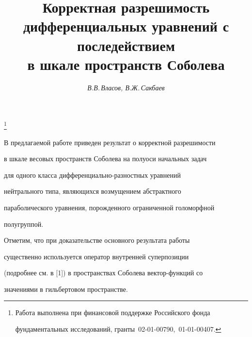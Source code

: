 \author{\it В.В.\,Власов, В.Ж.\,Сакбаев}




\title{Корректная разрешимость дифференциальных уравнений с последействием\\


в шкале пространств Соболева}


\thanks{Работа выполнена при финансовой поддержке Российского фонда


фундаментальных исследований, гранты \No\,02-01-00790, \No\,01-01-00407.}





\date{}




\pagestyle{plain} %







\maketitle


\label{begin}














В предлагаемой работе приведен результат о корректной разрешимости


в шкале весовых пространств Соболева на полуоси начальных задач


для одного класса дифференциально-разностных уравнений


нейтрального типа, являющихся возмущением абстрактного


параболического уравнения, порожденного ограниченной голоморфной


полугруппой.





Отметим, что при доказательстве основного результата работы


существенно используется оператор внутренней суперпозиции


(подробнее см. в [1]) в пространствах Соболева вектор-функций со


значениями в гильбертовом пространстве.





